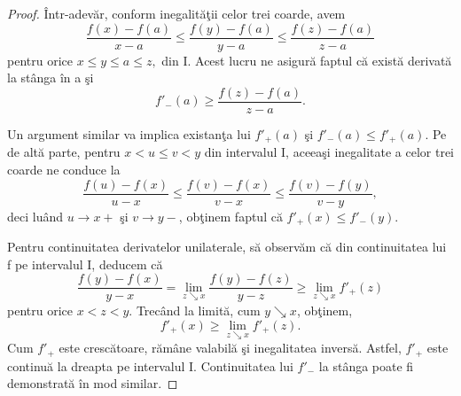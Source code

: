 \documentclass[a4paper,12pt,oneside]{report}
\begin{document}
\begin{proof}
\^{I}ntr-adev\u{a}r, conform inegalit\u{a}\c{t}ii celor trei coarde, avem
\begin{displaymath}
   \frac{f\left ( x \right ) - f\left ( a \right )}{x-a} \leq \frac{f\left ( y \right ) - f\left ( a \right )}{y-a}\leq \frac{f\left ( z \right ) - f\left ( a \right )}{z -a }
\end{displaymath}
pentru orice \(x\leq y\leq a\leq z,\) din I. Acest lucru ne asigur\u{a} faptul c\u{a} exist\u{a} derivat\u{a} la st\^{a}nga \^{i}n a \c{s}i
\begin{displaymath}
   {f}'_{-}\left ( a \right )\geq \frac{f\left ( z \right ) - f\left ( a \right )}{z-a}.
\end{displaymath}

Un argument similar va implica existan\c{t}a lui \({f}'_{+}\left ( a \right )\) \c{s}i  \({f}'_{-}\left ( a \right ) \leq  {f}'_{+}\left ( a \right )\). Pe de alt\u{a} parte, pentru \(x < u\leq v < y\) din intervalul I, aceea\c{s}i inegalitate a celor trei coarde ne conduce la
\begin{displaymath}
   \frac{f\left ( u \right ) - f\left ( x \right )}{u-x}\leq \frac{f\left ( v \right ) - f\left ( x \right )}{v - x}\leq \frac{f\left ( v \right ) - f\left ( y  \right )}{v - y},
\end{displaymath}
deci lu\^{a}nd \(u\rightarrow x+\) \c{s}i \(v\rightarrow y- \), ob\c{t}inem faptul c\u{a} \({f}'_{+}\left ( x \right )\leq {f}'_{-}\left ( y \right ).\)

Pentru continuitatea derivatelor unilaterale, s\u{a} observ\u{a}m c\u{a} din continuitatea lui f pe intervalul I, deducem c\u{a}
\begin{displaymath}
   \frac{f\left ( y \right ) - f\left ( x \right )}{y-x} = \lim_{z \searrow x}\frac{f\left ( y \right ) - f\left ( z \right )}{y-z} \geq \lim_{z\searrow x}{f}'_{+}\left ( z \right )
\end{displaymath}
pentru orice \(x < z < y\). Trec\^{a}nd la limit\u{a}, cum  \(y\searrow x \), ob\c{t}inem,
\begin{displaymath}
 {f}'_{+}\left ( x \right ) \geq  \lim_{z \searrow x } {f}'_{+}\left ( z \right ).
\end{displaymath}
Cum \({f}'_{+}\) este cresc\u{a}toare, r\u{a}m\^{a}ne valabil\u{a} \c{s}i inegalitatea invers\u{a}. Astfel, \({f}'_{+}\)  este  continu\u{a} la dreapta  pe intervalul I. Continuitatea  lui \({f}'_{-}\) la st\^{a}nga poate fi demonstrat\u{a} \^{i}n mod similar.
\end{proof}
\end{document}
